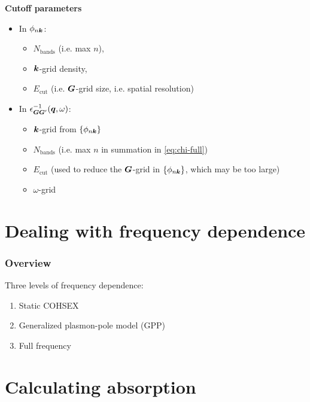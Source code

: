 \documentclass[t]{beamer}
\begin{document}
\begin{frame}[allowframebreaks]
\textbf{Cutoff parameters} \begin{itemize}
    \item In $\phi_{n \vb*{k}}$: 
    \begin{itemize}
        \item $N_{\text{bands}}$ (i.e. max $n$), 
        \item $\vb*{k}$-grid density, 
        \item $E_{\text{cut}}$ (i.e. $\vb*{G}$-grid size, i.e. spatial resolution)
    \end{itemize}

    \item In $\epsilon^{-1}_{\vb*{G} \vb*{G}'}(\vb*{q}, \omega)$:
    \begin{itemize}
        \item $\vb*{k}$-grid from $\{\phi_{n \vb*{k}}\}$
        \item $N_{\text{bands}}$ (i.e. max $n$ in summation in \eqref{eq:chi-full}) 
        \item $E_{\text{cut}}$ (used to reduce the $\vb*{G}$-grid in $\{\phi_{n \vb*{k}}\}$, 
        which may be too large)
        \item $\omega$-grid 
    \end{itemize}
\end{itemize}

\end{frame}

\section{Dealing with frequency dependence}

\begin{frame}
\frametitle{Overview}

Three levels of frequency dependence:
\begin{enumerate}
    \item Static COHSEX 
    \item Generalized plasmon-pole model (GPP)
    \item Full frequency
\end{enumerate}    

\end{frame}

\section{Calculating absorption}
\end{document}
